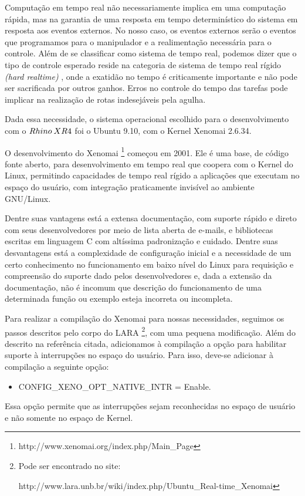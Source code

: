 Computação em tempo real não necessariamente implica em uma computação
rápida, mas na garantia de uma resposta em tempo determinístico do
sistema em resposta aos eventos externos. No nosso caso, os eventos
externos serão o eventos que programamos para o manipulador e a realimentação
necessária para o controle. Além de se classificar como sistema de
tempo real, podemos dizer que o tipo de controle esperado reside na
categoria de sistema de tempo real rígido \textit{(hard realtime)}
\cite{NimalNissanke1997}, onde a exatidão no tempo é criticamente
importante e não pode ser sacrificada por outros ganhos. Erros no
controle do tempo das tarefas pode implicar na realização de rotas
indesejáveis pela agulha.

Dada essa necessidade, o sistema operacional escolhido para o desenvolvimento
com o $Rhino\: XR4$ foi o Ubuntu 9.10, com o Kernel Xenomai 2.6.34.

O desenvolvimento do Xenomai%
\footnote{http://www.xenomai.org/index.php/Main\_Page%
} começou em 2001. Ele é uma base, de código fonte aberto, para desenvolvimento
em tempo real que coopera com o Kernel do Linux, permitindo capacidades
de tempo real rígido a aplicações que executam no espaço do usuário,
com integração praticamente invisível ao ambiente GNU/Linux.

Dentre suas vantagens está a extensa documentação, com suporte rápido
e direto com seus desenvolvedores por meio de lista aberta de e-mails,
e bibliotecas escritas em linguagem C com altíssima padronização e
cuidado. Dentre suas desvantagens está a complexidade de configuração
inicial e a necessidade de um certo conhecimento no funcionamento
em baixo nível do Linux para requisição e compreensão do suporte dado
pelos desenvolvedores e, dada a extensão da documentação, não é incomum
que descrição do funcionamento de uma determinada função ou exemplo
esteja incorreta ou incompleta.

Para realizar a compilação do Xenomai para nossas necessidades, seguimos
os passos descritos pelo corpo do LARA%
\footnote{Pode ser encontrado no site:

http://www.lara.unb.br/wiki/index.php/Ubuntu\_Real-time\_Xenomai%
}, com uma pequena modificação. Além do descrito na referência citada,
adicionamos à compilação a opção para habilitar suporte à interrupções
no espaço do usuário. Para isso, deve-se adicionar à compilação a
seguinte opção:
\begin{itemize}
\item CONFIG\_XENO\_OPT\_NATIVE\_INTR = Enable.
\end{itemize}
Essa opção permite que as interrupções sejam reconhecidas no espaço
de usuário e não somente no espaço de Kernel. 

